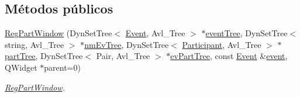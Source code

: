 \subsection*{Métodos públicos}
\begin{DoxyCompactItemize}
\item 
\hyperlink{class_reg_part_window_ab8d092b4fdf14ffe38b91644ca76d183}{Reg\+Part\+Window} (Dyn\+Set\+Tree$<$ \hyperlink{class_event}{Event}, Avl\+\_\+\+Tree $>$ $\ast$\hyperlink{class_reg_part_window_a47d9b536b8ba3b49f143856fb47d3342}{event\+Tree}, Dyn\+Set\+Tree$<$ string, Avl\+\_\+\+Tree $>$ $\ast$\hyperlink{class_reg_part_window_aa26133ca3263056494bb1df5356af77c}{nm\+Ev\+Tree}, Dyn\+Set\+Tree$<$ \hyperlink{class_participant}{Participant}, Avl\+\_\+\+Tree $>$ $\ast$\hyperlink{class_reg_part_window_a841c9497e5247f79f5e565ed127c8fe5}{part\+Tree}, Dyn\+Set\+Tree$<$ Pair, Avl\+\_\+\+Tree $>$ $\ast$\hyperlink{class_reg_part_window_a069dafb9e42cc355e21b5e5860b54dd4}{ev\+Part\+Tree}, const \hyperlink{class_event}{Event} \&\hyperlink{class_reg_part_window_a613f3532b18e98cb4b4bb81dda335b1a}{event}, Q\+Widget $\ast$parent=0)
\begin{DoxyCompactList}\small\item\em \hyperlink{class_reg_part_window}{Reg\+Part\+Window}. \end{DoxyCompactList}\end{DoxyCompactItemize}
